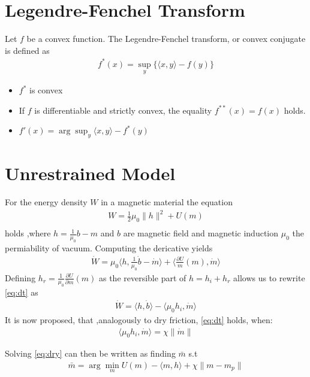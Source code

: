 \documentclass[a4paper,10pt]{article}
\begin{document}
 \section{Legendre-Fenchel Transform}
 Let $f$ be a convex function. The Legendre-Fenchel transform, or convex conjugate is defined as
 \begin{align}
  f^*(x) =  \sup_y\{\langle x, y\rangle - f(y) \}
 \end{align}
 \begin{itemize}
  \item $f^*$ is convex
  \item If $f$ is differentiable and strictly convex, the equality $f^{**}(x) = f(x)$ holds.
  \item $f'(x) = \arg \sup_y \langle x,y \rangle - f^*(y)$
 \end{itemize} 


\section{Unrestrained Model}

For the energy density $W$ in a magnetic material the equation
\begin{align}
    W = \frac{1}{2} \mu_0 \|h\|^2 + U(m) \label{eq:density1} \\
\end{align} holds ,where $h = \frac{1}{\mu_0} b - m$ and $b$ are magnetic field and magnetic induction $\mu_0$ the permiability of vacuum.
Computing the dericative yields
\begin{align} \label{eq:dt}
\dot W = \mu_0 \langle h,\frac{1}{\mu_0} \dot b - \dot m \rangle + \langle \frac{\partial U}{m}(m), \dot m \rangle
\end{align}
Defining $h_r = \frac{1}{\mu_0} \frac{\partial U}{\partial m}(m)$ as the reversible part of $h = h_i + h_r$ allows us to
rewrite \eqref{eq:dt} as
\begin{align} \label{eq:objective}
 \dot W = \langle h, \dot b \rangle - \langle \mu_0 h_i,\dot m \rangle
\end{align}
It is now proposed, that ,analogously to dry friction, \eqref{eq:dt} holds, when:
\begin{align} \label{eq:dry}
 \langle \mu_0 h_i,\dot m \rangle = \chi \|\dot m \|
\end{align}

Solving \eqref{eq:dry} can then be written as finding $\bar m$ s.t 
\begin{align}
\bar m = \arg \min_m U(m) - \langle m , h \rangle + \chi \|m - m_p\|
\end{align}
\end{document}
